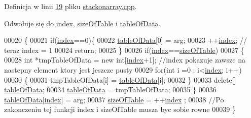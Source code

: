 Definicja w linii \hyperlink{stackonarray_8cpp_source_l00019}{19} pliku \hyperlink{stackonarray_8cpp_source}{stackonarray.\-cpp}.



Odwołuje się do \hyperlink{stackonarray_8h_source_l00022}{index}, \hyperlink{stackonarray_8h_source_l00020}{size\-Of\-Table} i \hyperlink{stackonarray_8h_source_l00024}{table\-Of\-Data}.


\begin{DoxyCode}
00020 \{
00021         \textcolor{keywordflow}{if}(\hyperlink{class_stack_on_array_a48bd7e27ae4baae328485c60f7773ca7}{index}==0)\{
00022                 \hyperlink{class_stack_on_array_a5c8979502e9a60271beebdd9e33d5822}{tableOfData}[0] = arg;
00023                 ++\hyperlink{class_stack_on_array_a48bd7e27ae4baae328485c60f7773ca7}{index}; \textcolor{comment}{// teraz index = 1}
00024                 \textcolor{keywordflow}{return};
00025         \}
00026         \textcolor{keywordflow}{if}(\hyperlink{class_stack_on_array_a48bd7e27ae4baae328485c60f7773ca7}{index}==\hyperlink{class_stack_on_array_ac7ab7f17614fd1692138317af349da90}{sizeOfTable}) 
00027         \{
00028                 \textcolor{keywordtype}{int} *tmpTableOfData = \textcolor{keyword}{new} \textcolor{keywordtype}{int}[\hyperlink{class_stack_on_array_a48bd7e27ae4baae328485c60f7773ca7}{index}+1];    \textcolor{comment}{//index pokazuje zawsze na nastepny element
       ktory jest jeszcze pusty}
00029                 \textcolor{keywordflow}{for}(\textcolor{keywordtype}{int} i =0 ; i<\hyperlink{class_stack_on_array_a48bd7e27ae4baae328485c60f7773ca7}{index}; i++)
00030                 \{
00031                         tmpTableOfData[i] = \hyperlink{class_stack_on_array_a5c8979502e9a60271beebdd9e33d5822}{tableOfData}[i];
00032                 \}
00033                 \textcolor{keyword}{delete}[] \hyperlink{class_stack_on_array_a5c8979502e9a60271beebdd9e33d5822}{tableOfData};
00034                 \hyperlink{class_stack_on_array_a5c8979502e9a60271beebdd9e33d5822}{tableOfData} = tmpTableOfData;
00035         \}
00036         \hyperlink{class_stack_on_array_a5c8979502e9a60271beebdd9e33d5822}{tableOfData}[\hyperlink{class_stack_on_array_a48bd7e27ae4baae328485c60f7773ca7}{index}] = arg;
00037         \hyperlink{class_stack_on_array_ac7ab7f17614fd1692138317af349da90}{sizeOfTable} = ++\hyperlink{class_stack_on_array_a48bd7e27ae4baae328485c60f7773ca7}{index} ;
00038         \textcolor{comment}{//Po zakonczeniu tej funkcji index i sizeOfTable musza byc sobie rowne}
00039 \}
\end{DoxyCode}


